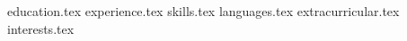 \documentclass[11pt, a4paper]{awesome-cv}
\newcommand*{\sectiondir}{resume/}
\begin{document}
\makecvheader

{education.tex}
{experience.tex}
{skills.tex}
{languages.tex}
{extracurricular.tex}
{interests.tex}
\end{document}
